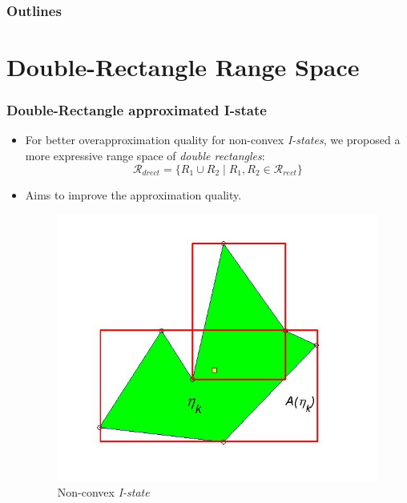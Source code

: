 \documentclass[compress]{beamer}
\begin{document}
\begin{frame}
  \frametitle{Outlines}
  \tableofcontents[]
  \transboxout
\end{frame}
\section[Double-Rectangle Range Space]{Double-Rectangle Range Space}

\begin{frame}\frametitle{Double-Rectangle approximated I-state}
\begin{itemize}
\item  For better overapproximation quality for non-convex \emph{I-states},
we proposed a more expressive range space of \emph{double rectangles}: \\
\begin{equation}
	\mathcal{R}_{drect} = \{ R_1 \cup R_2 \mid R_1, R_2 \in \mathcal{R}_{rect} \}
\end{equation}
 \item Aims to improve the approximation quality.
\begin{figure}
    \includegraphics[scale=0.26]{poly.jpg}
    \caption{Non-convex \emph{I-state}}
 \end{figure}

\end{itemize}
\transboxin
\end{frame}
\end{document}
